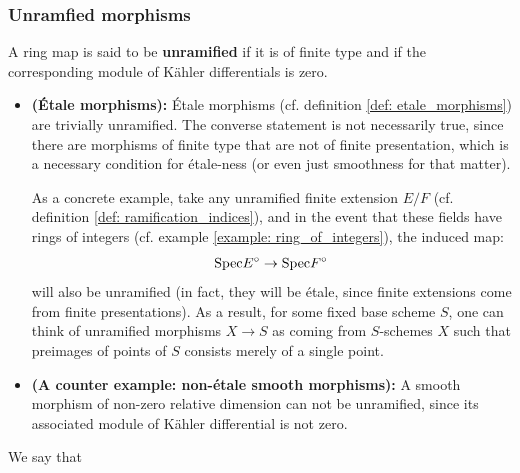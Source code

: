             \subsubsection{Unramfied morphisms}
                \begin{definition} \label{def: unramified_morphisms}
                    A ring map is said to be \textbf{unramified} if it is of finite type and if the corresponding module of K\"ahler differentials is zero. 
                \end{definition}
                \begin{example}
                    \noindent
                    \begin{itemize}
                        \item \textbf{(\'Etale morphisms):} \'Etale morphisms (cf. definition \ref{def: etale_morphisms}) are trivially unramified. The converse statement is not necessarily true, since there are morphisms of finite type that are not of finite presentation, which is a necessary condition for \'etale-ness (or even just smoothness for that matter).
                        
                        As a concrete example, take any unramified finite extension $E/F$ (cf. definition \ref{def: ramification_indices}), and in the event that these fields have rings of integers (cf. example \ref{example: ring_of_integers}), the induced map:
                            $$\mathrm{Spec} E^{\circ} \to \mathrm{Spec} F^{\circ}$$
                        will also be unramified (in fact, they will be \'etale, since finite extensions come from finite presentations). As a result, for some fixed base scheme $S$, one can think of unramified morphisms $X \to S$ as coming from $S$-schemes $X$ such that preimages of points of $S$ consists merely of a single point. 
                        \item \textbf{(A counter example: non-\'etale smooth morphisms):} A smooth morphism of non-zero relative dimension can not be unramified, since its associated module of K\"ahler differential is not zero. 
                    \end{itemize}
                \end{example}
                
                \begin{proposition} \label{prop: locality_of_ramification}
                    We say that 
                \end{proposition}
                
